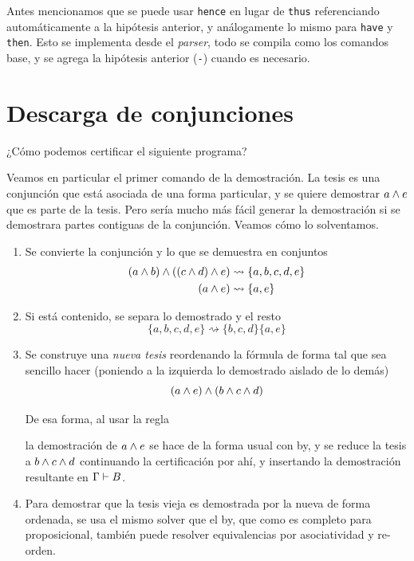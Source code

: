 Antes mencionamos que se puede usar \lstinline{hence} en lugar de \lstinline{thus} referenciando automáticamente a la hipótesis anterior, y análogamente lo mismo para \lstinline{have} y \lstinline{then}. Esto se implementa desde el \textit{parser}, todo se compila como los comandos base, y se agrega la hipótesis anterior (\lstinline{-}) cuando es necesario.

\section{Descarga de conjunciones}

¿Cómo podemos certificar el siguiente programa?



Veamos en particular el primer comando de la demostración. La tesis es una conjunción que está asociada de una forma particular, y se quiere demostrar $a \wedge e$ que es parte de la tesis. Pero sería mucho más fácil generar la demostración si se demostrara partes contiguas de la conjunción. Veamos cómo lo solventamos.

\begin{enumerate}
    \item Se convierte la conjunción y lo que se demuestra en conjuntos
    \begin{align*}
        (a \wedge b) \wedge ((c \wedge d) \wedge e)
        &\rightsquigarrow
        \{a, b, c, d, e\}\\
        (a \wedge e) &\rightsquigarrow \{a, e\}
    \end{align*}
    \item Si está contenido, se separa lo demostrado y el resto
    \[
        \{a, b, c, d, e\} \rightsquigarrow \{b, c, d\} \{a, e\}
    \]
    \item Se construye una \textit{nueva tesis} reordenando la fórmula de forma tal que sea sencillo hacer  (poniendo a la izquierda lo demostrado aislado de lo demás)
    \[
        (a \wedge e) \wedge (b \wedge c \wedge d)
    \]

    De esa forma, al usar la regla

    \proofTreeAndI

    la demostración de $a \wedge e$ se hace de la forma usual con by, y se reduce la tesis a $b \wedge c \wedge d$ continuando la certificación por ahí, y insertando la demostración resultante en $\Gamma \vdash B$.

    \item Para demostrar que la tesis vieja es demostrada por la nueva de forma ordenada, se usa el mismo solver que el by, que como es completo para proposicional, también puede resolver equivalencias por asociatividad y re-orden.
\end{enumerate}


